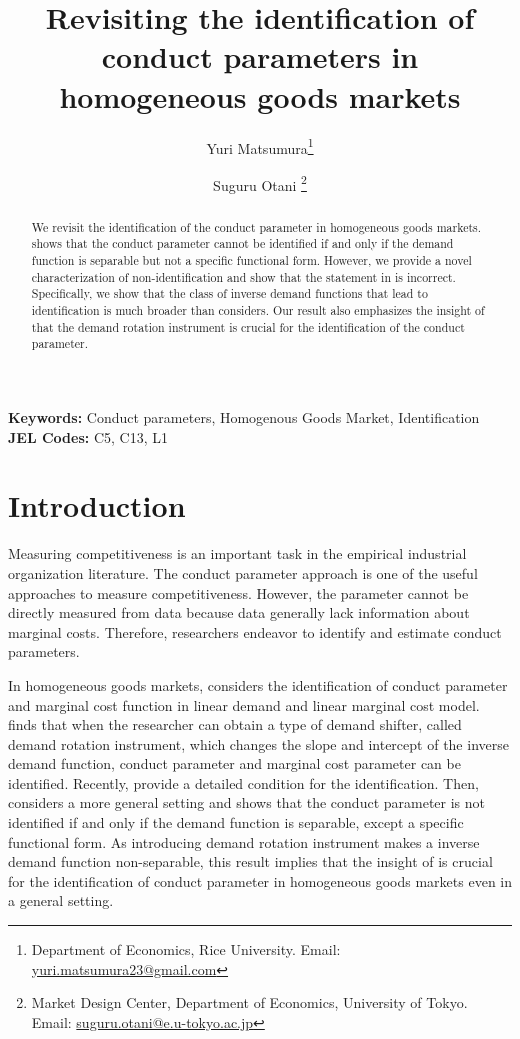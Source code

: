 \documentclass[11pt, a4paper]{article}
\title{Revisiting the identification of conduct parameters in homogeneous goods markets}
\author{Yuri Matsumura\thanks{Department of Economics, Rice University. Email: \href{mailto:yuri.matsumura23@gmail.com}{yuri.matsumura23@gmail.com}} \and Suguru Otani \thanks{Market Design Center, Department of Economics, University of Tokyo. Email: \href{mailto:suguru.otani@e.u-tokyo.ac.jp}{suguru.otani@e.u-tokyo.ac.jp}
}}
\theoremstyle{remark}
\begin{document}
\maketitle
\begin{abstract}
    We revisit the identification of the conduct parameter in homogeneous goods markets.
    \citet{lau1982identifying} shows that the conduct parameter cannot be identified if and only if the demand function is separable but not a specific functional form.
    However, we provide a novel characterization of non-identification and show that the statement in \citet{lau1982identifying} is incorrect.
    Specifically, we show that the class of inverse demand functions that lead to identification is much broader than \citet{lau1982identifying} considers.
    Our result also emphasizes the insight of \citet{bresnahan1982oligopoly} that the demand rotation instrument is crucial for the identification of the conduct parameter.
\end{abstract}

\noindent\textbf{Keywords:} Conduct parameters, Homogenous Goods Market, Identification
\vspace{0in}
\newline
\noindent\textbf{JEL Codes:} C5, C13, L1

\bigskip





\section{Introduction}
Measuring competitiveness is an important task in the empirical industrial organization literature.
The conduct parameter approach is one of the useful approaches to measure competitiveness.
However, the parameter cannot be directly measured from data because data generally lack information about marginal costs.
Therefore, researchers endeavor to identify and estimate conduct parameters.

In homogeneous goods markets, \cite{bresnahan1982oligopoly} considers the identification of conduct parameter and marginal cost function in linear demand and linear marginal cost model.
\citet{bresnahan1982oligopoly} finds that when the researcher can obtain a type of demand shifter, called demand rotation instrument, which changes the slope and intercept of the inverse demand function, conduct parameter and marginal cost parameter can be identified.
Recently, \citet{matsumura2023resolving} provide a detailed condition for the identification.
Then, \citet{lau1982identifying} considers a more general setting and shows that the conduct parameter is not identified if and only if the demand function is separable, except a specific functional form.
As introducing demand rotation instrument makes a inverse demand function non-separable, this result implies that the insight of \citet{bresnahan1982oligopoly} is crucial for the identification of conduct parameter in homogeneous goods markets even in a general setting.
\end{document}
